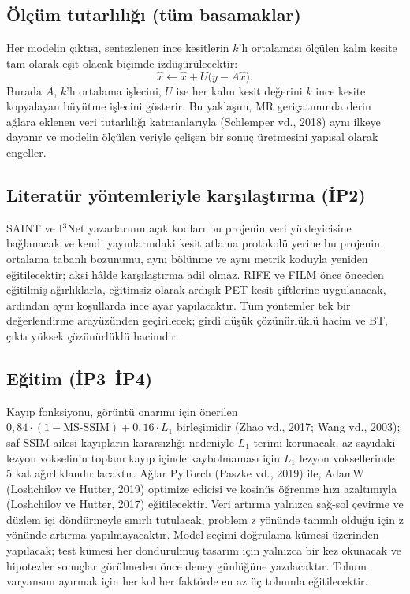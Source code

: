 \documentclass[11pt,a4paper]{article}
\begin{document}
\subsection{Ölçüm tutarlılığı (tüm basamaklar)}
Her modelin çıktısı, sentezlenen ince kesitlerin $k$'lı ortalaması ölçülen kalın kesite tam
olarak eşit olacak biçimde izdüşürülecektir:
\[
  \hat{x} \leftarrow \hat{x} + U\bigl(y - A\hat{x}\bigr).
\]
Burada $A$, $k$'lı ortalama işlecini, $U$ ise her kalın kesit değerini $k$ ince kesite kopyalayan
büyütme işlecini gösterir. Bu yaklaşım, MR geriçatımında derin ağlara eklenen veri tutarlılığı
katmanlarıyla (Schlemper vd., 2018) aynı ilkeye dayanır ve modelin ölçülen veriyle çelişen bir
sonuç üretmesini yapısal olarak engeller.

\subsection{Literatür yöntemleriyle karşılaştırma (İP2)}
SAINT ve I$^3$Net yazarlarının açık kodları bu projenin veri yükleyicisine bağlanacak ve kendi
yayınlarındaki kesit atlama protokolü yerine bu projenin ortalama tabanlı bozunumu, aynı bölünme
ve aynı metrik koduyla yeniden eğitilecektir; aksi hâlde karşılaştırma adil olmaz. RIFE ve FILM
önce önceden eğitilmiş ağırlıklarla, eğitimsiz olarak ardışık PET kesit çiftlerine uygulanacak,
ardından aynı koşullarda ince ayar yapılacaktır. Tüm yöntemler tek bir değerlendirme arayüzünden
geçirilecek; girdi düşük çözünürlüklü hacim ve BT, çıktı yüksek çözünürlüklü hacimdir.

\subsection{Eğitim (İP3--İP4)}
Kayıp fonksiyonu, görüntü onarımı için önerilen $0{,}84 \cdot (1 - \text{MS-SSIM}) + 0{,}16 \cdot
L_1$ birleşimidir (Zhao vd., 2017; Wang vd., 2003); saf SSIM ailesi kayıpların kararsızlığı
nedeniyle $L_1$ terimi korunacak, az sayıdaki lezyon vokselinin toplam kayıp içinde
kaybolmaması için $L_1$ lezyon voksellerinde 5 kat ağırlıklandırılacaktır. Ağlar PyTorch (Paszke
vd., 2019) ile, AdamW (Loshchilov ve Hutter, 2019) optimize edicisi ve kosinüs öğrenme hızı
azaltımıyla (Loshchilov ve Hutter, 2017) eğitilecektir. Veri artırma yalnızca sağ-sol çevirme ve
düzlem içi döndürmeyle sınırlı tutulacak, problem z yönünde tanımlı olduğu için z yönünde artırma
yapılmayacaktır. Model seçimi doğrulama kümesi üzerinden yapılacak; test kümesi her dondurulmuş
tasarım için yalnızca bir kez okunacak ve hipotezler sonuçlar görülmeden önce deney günlüğüne
yazılacaktır. Tohum varyansını ayırmak için her kol her faktörde en az üç tohumla
eğitilecektir.
\end{document}
